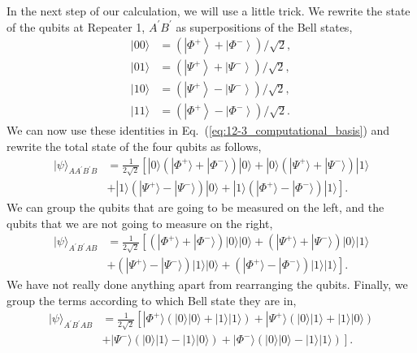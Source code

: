 In the next step of our calculation, we will use a little trick.
We rewrite the state of the qubits at Repeater 1, $A^{\prime}B^{\prime}$ as superpositions of the Bell states,
\begin{align}
|00\rangle & = \left(\left|\Phi^{+}\right\rangle+\left|\Phi^{-}\right\rangle\right) / \sqrt{2}, \\
|01\rangle & = \left(\left|\Psi^{+}\right\rangle+\left|\Psi^{-}\right\rangle\right) / \sqrt{2}, \\
|10\rangle & = \left(\left|\Psi^{+}\right\rangle-\left|\Psi^{-}\right\rangle\right) / \sqrt{2}, \\
|11\rangle & = \left(\left|\Phi^{+}\right\rangle-\left|\Phi^{-}\right\rangle\right) / \sqrt{2}.
\end{align}
We can now use these identities in Eq.~(\ref{eq:12-3_computational_basis}) and rewrite the total state of the four qubits as follows,
\begin{align}
    |\psi\rangle_{AA^{\prime}B^{\prime}B} & = \frac{1}{2\sqrt{2}} \left[ |0\rangle (|\Phi^+\rangle + |\Phi^-\rangle) |0\rangle + |0\rangle (|\Psi^+\rangle + |\Psi^-\rangle) |1\rangle \right. \nonumber\\
    & + \left. |1\rangle (|\Psi^+\rangle - |\Psi^-\rangle) |0\rangle + |1\rangle (|\Phi^+\rangle - |\Phi^-\rangle) |1\rangle \right].
\end{align}
We can group the qubits that are going to be measured on the left, and the qubits that we are not going to measure on the right,
\begin{align}
    |\psi\rangle_{A^{\prime}B^{\prime}AB} & = \frac{1}{2\sqrt{2}} \left[ (|\Phi^+\rangle + |\Phi^-\rangle)|0\rangle|0\rangle + (|\Psi^+\rangle + |\Psi^-\rangle)|0\rangle|1\rangle \right. \nonumber\\
    & + \left. (|\Psi^+\rangle - |\Psi^-\rangle)|1\rangle|0\rangle + (|\Phi^+\rangle - |\Phi^-\rangle)|1\rangle|1\rangle \right].
\end{align}
We have not really done anything apart from rearranging the qubits.
Finally, we group the terms according to which Bell state they are in,
\begin{align}
    |\psi\rangle_{A^{\prime}B^{\prime}AB} & = \frac{1}{2\sqrt{2}} \left[ |\Phi^+\rangle (|0\rangle|0\rangle + |1\rangle|1\rangle) + |\Psi^+\rangle (|0\rangle|1\rangle + |1\rangle|0\rangle) \right. \nonumber\\
    & + \left. |\Psi^-\rangle (|0\rangle|1\rangle - |1\rangle|0\rangle) + |\Phi^-\rangle (|0\rangle|0\rangle - |1\rangle|1\rangle) \right].
    \label{eq:12-3_almost_final}
\end{align}

